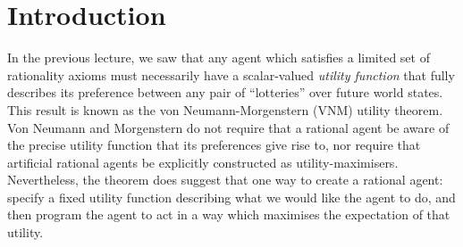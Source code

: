 \documentclass[11pt]{article}
\newtheorem{theorem}[lemma]{Theorem}
\newenvironment{proof}{\vspace{-0.05in}\noindent{\bf Proof:}}%
        {\hspace*{\fill}$\Box$\par}
\begin{document}
\setlength{\fboxrule}{.5mm}\setlength{\fboxsep}{1.2mm}
\newlength{\boxlength}\setlength{\boxlength}{\textwidth}
\addtolength{\boxlength}{-4mm}
\begin{center}\end{center}

\vspace{5mm}

%
%
%

\section{Introduction}

In the previous lecture, we saw that any agent which satisfies a limited set of
rationality axioms must necessarily have a scalar-valued \textit{utility
function} that fully describes its preference between any pair of ``lotteries''
over future world states.
%
This result is known as the von Neumann-Morgenstern (VNM) utility theorem.
%
Von Neumann and Morgenstern do not require that a rational agent be aware of the
precise utility function that its preferences give rise to, nor require that
artificial rational agents be explicitly constructed as utility-maximisers.
%
Nevertheless, the theorem does suggest that one way to create a rational agent:
specify a fixed utility function describing what we would like the agent to do,
and then program the agent to act in a way which maximises the expectation of
that utility.
\end{document}
